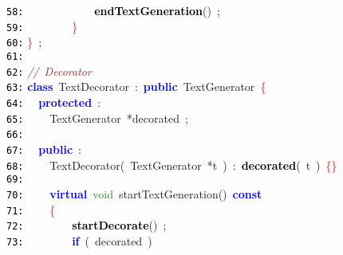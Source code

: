 \documentclass{article}
\begin{document}
\mbox{}\texttt{\textcolor{Black}{58:}} \ \ \ \ \ \ \ \ \ \ \ \ \textbf{\textcolor{Black}{endTextGeneration}}\textcolor{BrickRed}{()}\ \textcolor{BrickRed}{;} \\
\mbox{}\texttt{\textcolor{Black}{59:}} \ \ \ \ \ \ \ \ \textcolor{Red}{\}} \\
\mbox{}\texttt{\textcolor{Black}{60:}} \textcolor{Red}{\}}\ \textcolor{BrickRed}{;} \\
\mbox{}\texttt{\textcolor{Black}{61:}}  \\
\mbox{}\texttt{\textcolor{Black}{62:}} \textit{\textcolor{Brown}{//\ Decorator}} \\
\mbox{}\texttt{\textcolor{Black}{63:}} \textbf{\textcolor{Blue}{class}}\ \label{test.h:63}TextDecorator\ \textcolor{BrickRed}{:}\ \textbf{\textcolor{Blue}{public}}\ TextGenerator\ \textcolor{Red}{\{} \\
\mbox{}\texttt{\textcolor{Black}{64:}} \ \ \textbf{\textcolor{Blue}{protected}}\ \textcolor{BrickRed}{:} \\
\mbox{}\texttt{\textcolor{Black}{65:}} \ \ \ \ TextGenerator\ \textcolor{BrickRed}{*}\label{test.h:65}decorated\ \textcolor{BrickRed}{;} \\
\mbox{}\texttt{\textcolor{Black}{66:}} \ \  \\
\mbox{}\texttt{\textcolor{Black}{67:}} \ \ \textbf{\textcolor{Blue}{public}}\ \textcolor{BrickRed}{:} \\
\mbox{}\texttt{\textcolor{Black}{68:}} \ \ \ \ \label{test.h:68}TextDecorator\textcolor{BrickRed}{(}\ TextGenerator\ \textcolor{BrickRed}{*}t\ \textcolor{BrickRed}{)}\ \textcolor{BrickRed}{:}\ \textbf{\textcolor{Black}{decorated}}\textcolor{BrickRed}{(}\ t\ \textcolor{BrickRed}{)}\ \textcolor{Red}{\{\}} \\
\mbox{}\texttt{\textcolor{Black}{69:}}  \\
\mbox{}\texttt{\textcolor{Black}{70:}} \ \ \ \ \textbf{\textcolor{Blue}{virtual}}\ \textcolor{ForestGreen}{void}\ \label{test.h:70}startTextGeneration\textcolor{BrickRed}{()}\ \textbf{\textcolor{Blue}{const}}\  \\
\mbox{}\texttt{\textcolor{Black}{71:}} \ \ \ \ \textcolor{Red}{\{}\  \\
\mbox{}\texttt{\textcolor{Black}{72:}} \ \ \ \ \ \ \ \ \textbf{\textcolor{Black}{startDecorate}}\textcolor{BrickRed}{()}\ \textcolor{BrickRed}{;} \\
\mbox{}\texttt{\textcolor{Black}{73:}} \ \ \ \ \ \ \ \ \textbf{\textcolor{Blue}{if}}\ \textcolor{BrickRed}{(}\ decorated\ \textcolor{BrickRed}{)} \\
\end{document}
